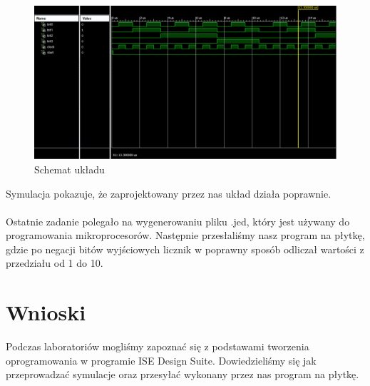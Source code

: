 \documentclass[12pt,a4paper,titlepage]{article}
\begin{document}
\begin{figure}[H]
\centering
\includegraphics[width=13.5cm]{symulacja.png}
\caption{Schemat układu}
\label{fig:symulacja}
\end{figure}
Symulacja pokazuje, że zaprojektowany przez nas układ działa poprawnie.
\\\\
Ostatnie zadanie polegało na wygenerowaniu pliku .jed, który jest używany do programowania mikroprocesorów. Następnie przesłaliśmy nasz program na płytkę, gdzie po negacji bitów wyjściowych licznik w poprawny sposób odliczał wartości z przedziału od 1 do 10.

\section{Wnioski}
Podczas laboratoriów mogliśmy zapoznać się z podstawami tworzenia oprogramowania w programie ISE Design Suite. Dowiedzieliśmy się jak przeprowadzać symulacje oraz przesyłać wykonany przez nas program na płytkę.
\end{document}
